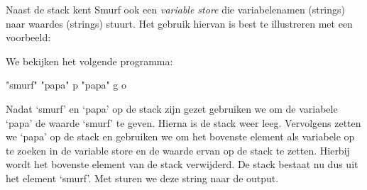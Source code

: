 Naast de stack kent Smurf ook een \emph{variable store} die variabelenamen
(strings) naar waardes (strings) stuurt. Het gebruik hiervan is best te
illustreren met een voorbeeld:

\begin{exmp}
	We bekijken het volgende programma:
	\begin{smurf}"smurf" "papa" p "papa" g o\end{smurf}
	Nadat `smurf' en `papa' op de stack zijn gezet gebruiken we 
	om de variabele `papa' de waarde `smurf' te geven. Hierna is de stack weer
	leeg. Vervolgens zetten we `papa' op de stack en gebruiken we 
	om het bovenste element als variabele op te zoeken in de variable store en de
	waarde ervan op de stack te zetten. Hierbij wordt het bovenste element van de
	stack verwijderd. De stack bestaat nu dus uit het element `smurf'. Met
	 sturen we deze string naar de output.
\end{exmp}





